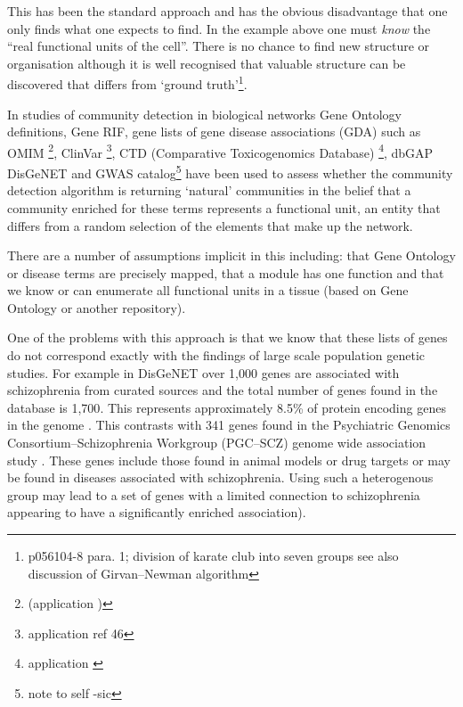 This has been the standard approach and has the obvious disadvantage that one only finds what one expects to find. In the example above one must \textit{know} the ``real functional units of the cell''. There is no chance to find new structure or organisation although it is well recognised that valuable structure can be discovered that differs from `ground truth'\cite{fortunato2016community}\footnote{p056104-8 para. 1; division of karate club into seven groups see also discussion of Girvan–Newman algorithm}. 

In studies of community detection in biological networks Gene Ontology definitions\cite{mclean2016improved}, Gene RIF, gene lists of gene disease associations (GDA) such as OMIM \cite{hamosh2005online}\footnote{(application \cite{ghiassian2015disease})}, ClinVar \cite{landrum2016clinvar}\footnote{application \cite{luck2020reference} ref 46}, CTD (Comparative Toxicogenomics Database) \cite{davis2019comparative}\footnote{application \cite{baker2012geneweaver}}, dbGAP \cite{tryka2014ncbi} DisGeNET \cite{pinero2020disgenet} \cite{pinero2016disgenet} and GWAS catalog\footnote{note to self -sic}\cite{welter2014nhgri} have been used  to assess whether the community detection algorithm is returning `natural' communities in the belief that a community enriched for these terms represents a functional unit, an entity that differs from a random selection of the elements that make up the network. 

There are a number of assumptions implicit in this including: that Gene Ontology or disease terms are precisely mapped, that a module has one function and that we know or can enumerate all functional units in a tissue (based on Gene Ontology or another repository).

One of the problems with this approach is that we know that these lists of genes do not correspond exactly with the findings of large scale population genetic studies. For example in DisGeNET over 1,000 genes are associated with schizophrenia from curated sources and the total number of genes found in the database is 1,700\cite{pinero2020disgenet}. This represents approximately 8.5\% of protein encoding genes in the genome \cite{ezkurdia2014multiple}. This contrasts with 341 genes found in the Psychiatric Genomics Consortium–Schizophrenia Workgroup (PGC–SCZ) genome wide association study \cite{ripke2014biological}. These genes include those found in animal models or drug targets or may be found in diseases associated with schizophrenia. Using such a heterogenous group may lead to a set of genes with a limited connection to schizophrenia appearing to have a significantly enriched association).  

